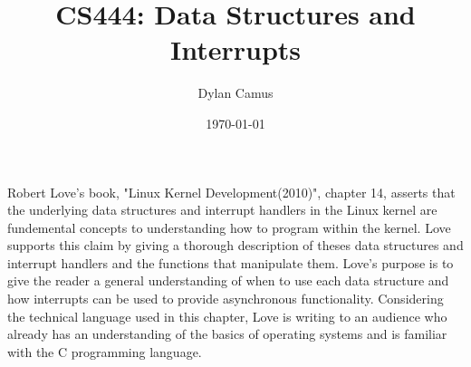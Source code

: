 \documentclass[letterpaper,10pt]{article}
\title{CS444: Data Structures and Interrupts}
\author{Dylan Camus}
\date{\today}
\begin{document}
\maketitle
Robert Love's book, "Linux Kernel Development(2010)", chapter 14, asserts that the underlying data structures and interrupt handlers in the Linux kernel are fundemental concepts to understanding how to program within the kernel. Love supports this claim by giving a thorough description of theses data structures and interrupt handlers and the functions that manipulate them. Love's purpose is to give the reader a general understanding of when to use each data structure and how interrupts can be used to provide asynchronous functionality. Considering the technical language used in this chapter, Love is writing to an audience who already has an understanding of the basics of operating systems and is familiar with the C programming language.
\end{document}
